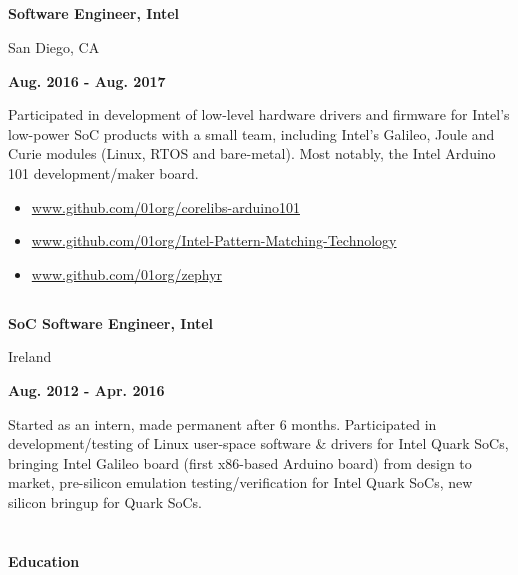 \documentclass[6pt]{article}
\begin{document}
\begin{minipage}{38em}
\subsection*{}
    \begin{minipage}[b]{20em}
{\bfseries Software Engineer, Intel

San Diego, CA}
\end{minipage}
\hfill
\begin{minipage}[b]{12em}
{\bfseries Aug. 2016 - Aug. 2017}
\end{minipage}
\begin{flushleft}
Participated in development of low-level hardware drivers and firmware for Intel's low-power
SoC products with a small team, including Intel's Galileo, Joule and Curie modules (Linux,
RTOS and bare-metal). Most notably, the Intel Arduino 101 development/maker board.
\begin{itemize}
    \setlength\itemsep{0em}
    \item \url{www.github.com/01org/corelibs-arduino101}
    \item \url{www.github.com/01org/Intel-Pattern-Matching-Technology}
    \item \url{www.github.com/01org/zephyr}
\end{itemize}
\end{flushleft}
\dotfill
\vspace{-0.8em}
%
%
\subsection*{}
\begin{minipage}[b]{20em}
{\bfseries SoC Software Engineer, Intel

Ireland}

\end{minipage}
\hfill
\begin{minipage}[b]{12em}
{\bfseries \hfill Aug. 2012 - Apr. 2016}
\end{minipage}
\begin{flushleft}
Started as an intern, made permanent after 6 months. Participated in development/testing of
Linux user-space software \& drivers for Intel Quark SoCs, bringing Intel Galileo board
(first x86-based Arduino board) from design to market, pre-silicon emulation
testing/verification for Intel Quark SoCs, new silicon bringup for Quark SoCs.
\end{flushleft}

\section*{}
{\Large \bfseries Education}


\end{minipage}
\end{document}
